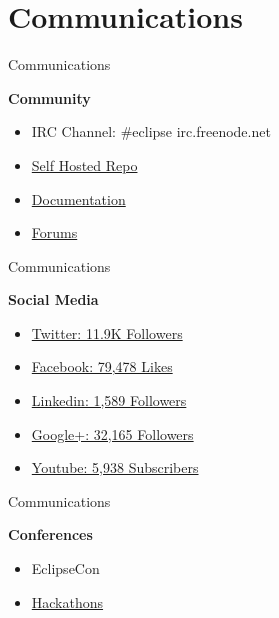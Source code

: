 \documentclass[10pt, compress]{beamer}
\begin{document}
\section{Communications}

\begin{frame}{Communications}

\textbf{Community}
\begin{itemize}
\item IRC Channel: \#eclipse irc.freenode.net
\item \href{http://git.eclipse.org/gitroot/platform/eclipse.platform.common.git master}{\alert{Self Hosted Repo}}
\item \href{http://www.eclipse.org/documentation/}{\alert{Documentation}}
\item \href{http://www.eclipse.org/forums/index.php?t=thread&frm_id=100 }{\alert{Forums}}
\end{itemize}

\end{frame}

\begin{frame}{Communications}

\textbf{Social Media}
\begin{itemize}
\item \href{https://twitter.com/EclipseFdn}{\alert{Twitter: 11.9K Followers}}
\item \href{https://www.facebook.com/eclipse.org }{\alert{Facebook: 79,478 Likes}}
\item \href{https://www.linkedin.com/company/eclipse-foundation}{\alert{Linkedin: 1,589 Followers}}
\item \href{https://plus.google.com/+Eclipse/}{\alert{Google+: 32,165 Followers}}
\item \href{https://www.youtube.com/user/EclipseFdn}{\alert{Youtube: 5,938 Subscribers}}
\end{itemize}

\end{frame}

\begin{frame}{Communications}

\textbf{Conferences}
\begin{itemize}
\item EclipseCon
\item \href{http://events.eclipse.org/}{\alert{Hackathons}}
\end{itemize}


\end{frame}
\end{document}
